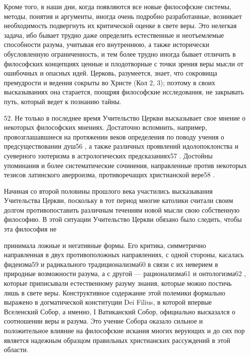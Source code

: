\documentclass[a5paper,10pt]{article}
\begin{document}
Кроме того, в наши дни, когда появляются все новые философские системы, методы,
понятия и аргументы, иногда очень подробно разработанные, возникает
необходимость подвергнуть их критической оценке в свете веры. Это нелегкая
задача, ибо бывает трудно даже определить естественные и неотъемлемые
способности разума, учитывая его внутреннюю, а также исторически обусловленную
ограниченность, и тем более трудно иногда бывает отличить в философских
концепциях ценные и плодотворные с точки зрения веры мысли от ошибочных и
опасных идей. Церковь, разумеется, знает, что сокровища премудрости и ведения
сокрыты во Христе (Кол 2, 3); поэтому в своих высказываниях она старается,
поощряя философские исследования, не закрывать путь, который ведет к познанию
тайны.

52. Не только в последнее время Учительство Церкви высказывает свое мнение о
некоторых философских мнениях. Достаточно вспомнить, например,
провозглашавшиеся на протяжении веков определения по поводу учения о
предсуществовании душ56 , а также различных проявлений идолопоклонства и
суеверного эзотеризма в астрологических предсказаниях57 . Достойны упоминания и
более систематические сочинения, направленные против некоторых тезисов
латинского аверроизма, противоречащих христианской вере58 .

Начиная со второй половины прошлого века участились высказывания Учительства
Церкви, поскольку в тот период многие католики считали своим долгом
противопоставить различным течениям новой мысли свою собственную философию. В
этой ситуации Учительство Церкви обязано было следить, чтобы эта философия не

принимала ложные и негативные формы. Его критика, симметрично направленная в
двух противоположных направлениях, с одной стороны, касалась фидеизма59 и
радикального традиционализма60 в связи с их неверием в природные возможности
разума, а с другой — рационализма61 и онтологизма62 , которые приписывали
естественному разуму знания, которые можно постичь лишь в свете веры.
Конструктивное содержание этой полемики формально выражено в догматической
конституции Dei Filius, в которой впервые Вселенский Собор, а именно, I
Ватиканский Собор, официально высказался о соотношении веры и разума. Это
учение Собора оказало сильное и положительное влияние на философские искания
многих верующих и до сих пор является надежным образцом правильных христианских
рассуждений в этой области.
\end{document}
